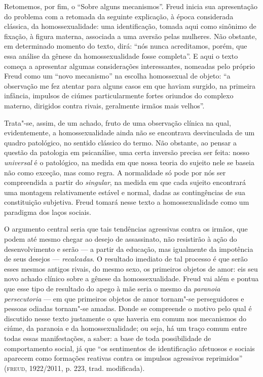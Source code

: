 Retomemos, por fim, o ``Sobre alguns mecanismos''. Freud inicia sua
apresentação do problema com a retomada da seguinte explicação, à época
considerada clássica, da homossexualidade: uma identificação, tomada
aqui como sinônimo de fixação, à figura materna, associada a uma aversão
pelas mulheres. Não obstante, em determinado momento do texto, dirá:
``nós nunca acreditamos, porém, que essa análise da gênese da
homossexualidade fosse completa''. E aqui o texto começa a apresentar
algumas considerações interessantes, nomeadas pelo próprio Freud como um
``novo mecanismo'' na escolha homossexual de objeto: ``a observação me
fez atentar para alguns casos em que haviam surgido, na primeira
infância, impulsos de ciúmes particularmente fortes oriundos do complexo
materno, dirigidos contra rivais, geralmente irmãos mais velhos''.

Trata"-se, assim, de um achado, fruto de uma observação clínica na qual,
evidentemente, a homossexualidade ainda não se encontrava desvinculada
de um quadro patológico, no sentido clássico do termo. Não obstante, ao
pensar a questão da patologia em psicanálise, uma certa inversão precisa
ser feita: nosso \emph{universal} é o patológico, na medida em que nossa
teoria do sujeito nele se baseia não como exceção, mas como regra. A
normalidade só pode por nós ser compreendida a partir do
\emph{singular}, na medida em que cada sujeito encontrará uma montagem
relativamente estável e normal, dadas as contingências de sua
constituição subjetiva. Freud tomará nesse texto a homossexualidade como
um paradigma dos laços sociais.

O argumento central seria que tais tendências agressivas contra os
irmãos, que podem até mesmo chegar ao desejo de assassinato, não
resistirão à ação do desenvolvimento e serão --- a partir da educação,
mas igualmente da impotência de seus desejos --- \emph{recalcadas}. O
resultado imediato de tal processo é que serão esses mesmos antigos
rivais, do mesmo sexo, os primeiros objetos de amor: eis seu novo achado
clínico sobre a gênese da homossexualidade. Freud vai além e pontua que
esse tipo de resultado do apego à mãe seria o mesmo da \emph{paranoia
persecutoria} --- em que primeiros objetos de amor tornam"-se
perseguidores e pessoas odiadas tornam"-se amadas. Donde se compreende o
motivo pelo qual é discutido nesse texto justamente o que haveria em
comum nos mecanismos do ciúme, da paranoia e da homossexualidade; ou
seja, há um traço comum entre todas essas manifestações, a saber: a base
de toda possibilidade de comportamento social, já que ``os sentimentos
de identificação afetuosos e sociais aparecem como formações reativas
contra os impulsos agressivos reprimidos'' (\textsc{freud}, 1922/2011, p. 223, trad. modificada).

